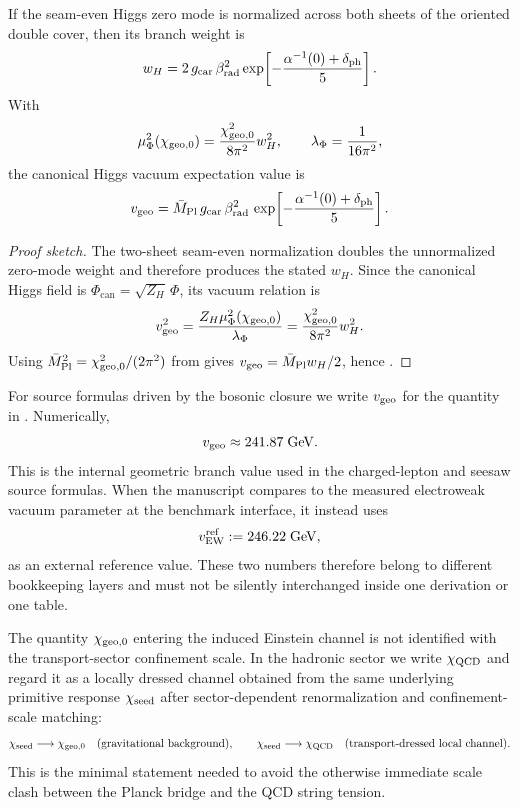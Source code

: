 \begin{lemma}
\label{lem:two-sheet-zero-mode-normalization}
If the seam-even Higgs zero mode is normalized across both sheets of the oriented double cover, then its branch weight is
\[
w_H
=
2\,g_{\mathrm{car}}\,\beta_{\mathrm{rad}}^2
\exp\!\left[-\frac{\alpha^{-1}(0)+\delta_{\mathrm{ph}}}{5}\right].
\]
With
\[
\mu_\Phi^2(\chi_{\mathrm{geo},0})=\frac{\chi_{\mathrm{geo},0}^2}{8\pi^2}w_H^2,
\qquad
\lambda_\Phi=\frac{1}{16\pi^2},
\]
the canonical Higgs vacuum expectation value is
\begin{equation}
\label{eq:carrier-dressed-v}
v_{\mathrm{geo}}
=
\bar M_{\mathrm{Pl}}\,g_{\mathrm{car}}\,\beta_{\mathrm{rad}}^2\,
\exp\!\left[-\frac{\alpha^{-1}(0)+\delta_{\mathrm{ph}}}{5}\right].
\end{equation}
\end{lemma}

\begin{proof}[Proof sketch]
The two-sheet seam-even normalization doubles the unnormalized zero-mode weight and therefore produces the stated $w_H$. Since the canonical Higgs field is $\Phi_{\mathrm{can}}=\sqrt{Z_H}\,\Phi$, its vacuum relation is
\[
v_{\mathrm{geo}}^2=\frac{Z_H\mu_\Phi^2(\chi_{\mathrm{geo},0})}{\lambda_\Phi}
=
\frac{\chi_{\mathrm{geo},0}^2}{8\pi^2}w_H^2.
\]
Using $\bar M_{\mathrm{Pl}}^2=\chi_{\mathrm{geo},0}^2/(2\pi^2)$ from  gives $v_{\mathrm{geo}}=\bar M_{\mathrm{Pl}} w_H/2$, hence .
\end{proof}

\begin{remark}
For source formulas driven by the bosonic closure we write $v_{\mathrm{geo}}$ for the quantity in . Numerically,
\[
v_{\mathrm{geo}}\approx\num{241.87}\;\mathrm{GeV}.
\]
This is the internal geometric branch value used in the charged-lepton and seesaw source formulas. When the manuscript compares to the measured electroweak vacuum parameter at the benchmark interface, it instead uses
\[
v_{\mathrm{EW}}^{\mathrm{ref}}:=\num{246.22}\;\mathrm{GeV},
\]
as an external reference value. These two numbers therefore belong to different bookkeeping layers and must not be silently interchanged inside one derivation or one table.
\end{remark}

\begin{remark}
The quantity $\chi_{\mathrm{geo},0}$ entering the induced Einstein channel is not identified with the transport-sector confinement scale. In the hadronic sector we write $\chi_{\mathrm{QCD}}$ and regard it as a locally dressed channel obtained from the same underlying primitive response $\chi_{\mathrm{seed}}$ after sector-dependent renormalization and confinement-scale matching:
\[
\chi_{\mathrm{seed}} \longrightarrow \chi_{\mathrm{geo},0} \quad \text{(gravitational background)},
\qquad
\chi_{\mathrm{seed}} \longrightarrow \chi_{\mathrm{QCD}} \quad \text{(transport-dressed local channel)}.
\]
This is the minimal statement needed to avoid the otherwise immediate scale clash between the Planck bridge and the QCD string tension.
\end{remark}

